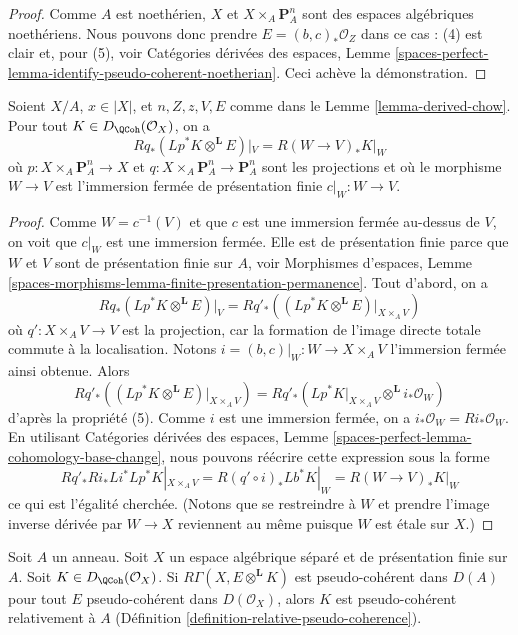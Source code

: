 \begin{proof}
\medskip\noindent
Comme $A$ est noethérien, $X$ et $X \times_A \mathbf{P}^n_A$
sont des espaces algébriques noethériens. Nous pouvons donc prendre $E = (b, c)_*\mathcal{O}_Z$
dans ce cas : (4) est clair et, pour (5), voir
Catégories dérivées des espaces, Lemme
\ref{spaces-perfect-lemma-identify-pseudo-coherent-noetherian}.
Ceci achève la démonstration.
\end{proof}

\begin{lemma}
\label{lemma-compute-Fourier-Mukai-for-derived-chow}
Soient $X/A$, $x \in |X|$, et
$n, Z, z, V, E$ comme dans le Lemme \ref{lemma-derived-chow}.
Pour tout $K \in D_\QCoh(\mathcal{O}_X)$, on a
$$
Rq_*(Lp^*K \otimes^\mathbf{L} E)|_V = R(W \to V)_*K|_W
$$
où $p : X \times_A \mathbf{P}^n_A \to X$ et
$q : X \times_A \mathbf{P}^n_A \to \mathbf{P}^n_A$ sont
les projections et où le morphisme $W \to V$ est
l'immersion fermée de présentation finie $c|_W : W \to V$.
\end{lemma}

\begin{proof}
Comme $W = c^{-1}(V)$ et que $c$ est une immersion fermée
au-dessus de $V$, on voit que $c|_W$ est une immersion fermée.
Elle est de présentation finie parce que $W$ et $V$ sont de présentation
finie sur $A$, voir
Morphismes d'espaces, Lemme
\ref{spaces-morphisms-lemma-finite-presentation-permanence}.
Tout d'abord, on a
$$
Rq_*(Lp^*K \otimes^\mathbf{L} E)|_V =
Rq'_*\left((Lp^*K \otimes^\mathbf{L} E)|_{X \times_A V}\right)
$$
où $q' : X \times_A V \to V$ est la projection, car
la formation de l'image directe totale commute à la localisation.
Notons $i = (b, c)|_W : W \to X \times_A V$ l'immersion fermée ainsi obtenue.
Alors
$$
Rq'_*\left((Lp^*K \otimes^\mathbf{L} E)|_{X \times_A V}\right) =
Rq'_*(Lp^*K|_{X \times_A V} \otimes^\mathbf{L} i_*\mathcal{O}_W)
$$
d'après la propriété (5). Comme $i$ est une immersion fermée, on a
$i_*\mathcal{O}_W = Ri_*\mathcal{O}_W$.
En utilisant
Catégories dérivées des espaces,
Lemme \ref{spaces-perfect-lemma-cohomology-base-change},
nous pouvons réécrire cette expression sous la forme
$$
Rq'_* Ri_* Li^* Lp^*K|_{X \times_A V} =
R(q' \circ i)_* Lb^*K|_W =
R(W \to V)_* K|_W
$$
ce qui est l'égalité cherchée. (Notons que se restreindre à $W$
et prendre l'image inverse dérivée par $W \to X$ reviennent au même
puisque $W$ est \'etale sur $X$.)
\end{proof}

\begin{lemma}
\label{lemma-characterize-pseudo-coherent}
Soit $A$ un anneau. Soit $X$ un espace algébrique séparé et
de présentation finie sur $A$. Soit $K \in D_\QCoh(\mathcal{O}_X)$.
Si $R\Gamma(X, E \otimes^\mathbf{L} K)$ est pseudo-cohérent
dans $D(A)$ pour tout $E$ pseudo-cohérent dans $D(\mathcal{O}_X)$,
alors $K$ est pseudo-cohérent relativement à $A$
(Définition \ref{definition-relative-pseudo-coherence}).
\end{lemma}

